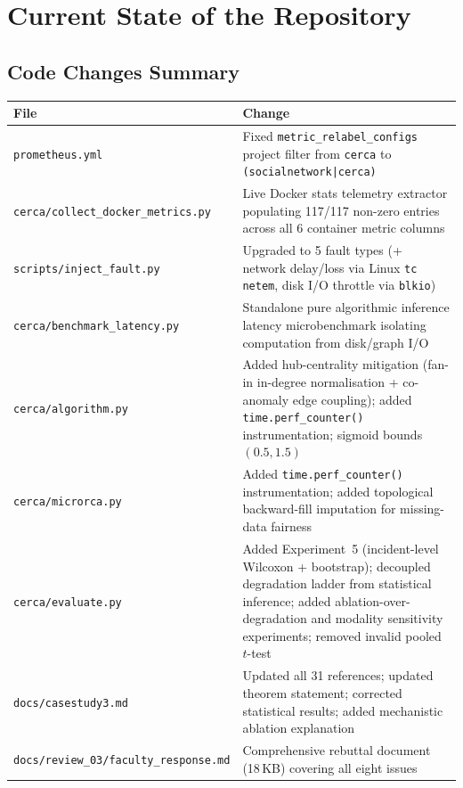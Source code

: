 \documentclass[11pt,a4paper]{article}
\newcommand{\tb}[1]{\textbf{#1}}
\begin{document}
\section{Current State of the Repository}

\subsection{Code Changes Summary}

\begin{center}\small
\begin{tabular}{|L{5.2cm}|L{8.4cm}|}
\hline
\tb{File} & \tb{Change} \\ \hline
\texttt{prometheus.yml} & Fixed \texttt{metric\_relabel\_configs} project filter from \texttt{cerca} to \texttt{(socialnetwork|cerca)} \\ \hline
\texttt{cerca/collect\_docker\_metrics.py} & Live Docker stats telemetry extractor populating 117/117 non-zero entries across all 6 container metric columns \\ \hline
\texttt{scripts/inject\_fault.py} & Upgraded to 5 fault types (+ network delay/loss via Linux \texttt{tc netem}, disk I/O throttle via \texttt{blkio}) \\ \hline
\texttt{cerca/benchmark\_latency.py} & Standalone pure algorithmic inference latency microbenchmark isolating computation from disk/graph I/O \\ \hline
\texttt{cerca/algorithm.py} & Added hub-centrality mitigation (fan-in in-degree normalisation + co-anomaly edge coupling); added \texttt{time.perf\_counter()} instrumentation; sigmoid bounds $(0.5, 1.5)$ \\ \hline
\texttt{cerca/microrca.py} & Added \texttt{time.perf\_counter()} instrumentation; added topological backward-fill imputation for missing-data fairness \\ \hline
\texttt{cerca/evaluate.py} & Added Experiment~5 (incident-level Wilcoxon + bootstrap); decoupled degradation ladder from statistical inference; added ablation-over-degradation and modality sensitivity experiments; removed invalid pooled $t$-test \\ \hline
\texttt{docs/casestudy3.md} & Updated all 31 references; updated theorem statement; corrected statistical results; added mechanistic ablation explanation \\ \hline
\texttt{docs/review\_03/faculty\_response.md} & Comprehensive rebuttal document (18\,KB) covering all eight issues \\ \hline
\end{tabular}
\end{center}
\end{document}
